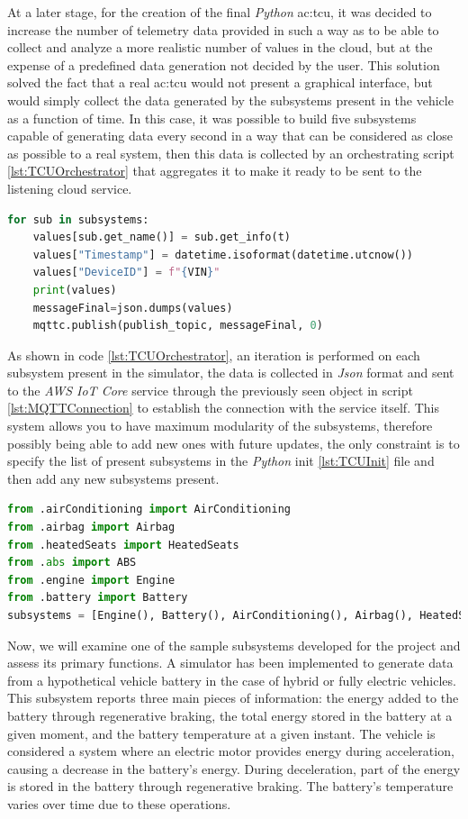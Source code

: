 At a later stage, for the creation of the final \textit{Python} \gls{ac:tcu}, it was decided to increase the number of telemetry data provided in such a way as to be able to collect and analyze a more realistic number of values in the cloud, but at the expense of a predefined data generation not decided by the user. This solution solved the fact that a real \gls{ac:tcu} would not present a graphical interface, but would simply collect the data generated by the subsystems present in the vehicle as a function of time. In this case, it was possible to build five subsystems capable of generating data every second in a way that can be considered as close as possible to a real system, then this data is collected by an orchestrating script \ref{lst:TCUOrchestrator} that aggregates it to make it ready to be sent to the listening cloud service.
\begin{lstlisting}[language=Python, caption={\textit{TCU} orchestrator that collects data from other subsystems}, label=lst:TCUOrchestrator]
for sub in subsystems:
    values[sub.get_name()] = sub.get_info(t)
    values["Timestamp"] = datetime.isoformat(datetime.utcnow())
    values["DeviceID"] = f"{VIN}"
    print(values)
    messageFinal=json.dumps(values)
    mqttc.publish(publish_topic, messageFinal, 0)    
\end{lstlisting}

As shown in code \ref{lst:TCUOrchestrator}, an iteration is performed on each subsystem present in the simulator, the data is collected in \textit{Json} format and sent to the \textit{AWS IoT Core} service through the previously seen object in script \ref{lst:MQTTConnection} to establish the connection with the service itself. This system allows you to have maximum modularity of the subsystems, therefore possibly being able to add new ones with future updates, the only constraint is to specify the list of present subsystems in the \textit{Python} init \ref{lst:TCUInit} file and then add any new subsystems present.
\begin{lstlisting}[language=Python, caption={\textit{TCU} init file for the import of the \textit{TCU} subsystems}, label=lst:TCUInit]
from .airConditioning import AirConditioning
from .airbag import Airbag
from .heatedSeats import HeatedSeats
from .abs import ABS
from .engine import Engine
from .battery import Battery
subsystems = [Engine(), Battery(), AirConditioning(), Airbag(), HeatedSeats(), ABS()]  
\end{lstlisting}

Now, we will examine one of the sample subsystems developed for the project and assess its primary functions. A simulator has been implemented to generate data from a hypothetical vehicle battery in the case of hybrid or fully electric vehicles. This subsystem reports three main pieces of information: the energy added to the battery through regenerative braking, the total energy stored in the battery at a given moment, and the battery temperature at a given instant. The vehicle is considered a system where an electric motor provides energy during acceleration, causing a decrease in the battery's energy. During deceleration, part of the energy is stored in the battery through regenerative braking. The battery's temperature varies over time due to these operations.

